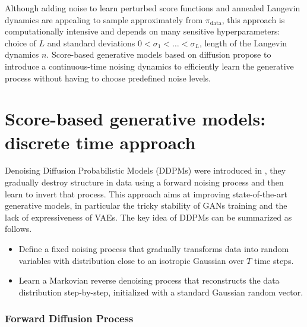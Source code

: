 \documentclass[english,graybox,envcountchap,envcountsame,sectrefs,shortlabels]{svmono}
\theoremstyle{style}
\begin{document}
Although adding noise to learn perturbed score functions and annealed Langevin dynamics are appealing to sample approximately from $\pi_{\mathrm{data}}$, this approach is computationally intensive and depends on many sensitive hyperparameters: choice of $L$ and standard deviations $0<\sigma_1 < \ldots <\sigma_L$, length of the Langevin dynamics $n$.  Score-based generative models based on diffusion propose to introduce a continuous-time noising dynamics to efficiently learn the generative process without having to choose predefined noise levels.

\section{Score-based generative models: discrete time approach}

Denoising Diffusion Probabilistic Models (DDPMs) were introduced in \cite{ho2020denoising}, they gradually destroy structure in data using a
forward noising process and then learn to invert that process. This approach aims at improving state-of-the-art generative models, in particular the tricky stability of GANs training and the lack of expressiveness of VAEs. The key idea of DDPMs can be summarized as follows.
\begin{itemize}
    \item Define a fixed noising process that gradually transforms data into
    random variables with distribution close to an isotropic Gaussian over $T$ time steps.
    \item Learn a  Markovian reverse denoising process that reconstructs the data distribution
    step-by-step, initialized with a standard Gaussian random vector.
\end{itemize}

\subsubsection*{Forward Diffusion Process}
\end{document}

